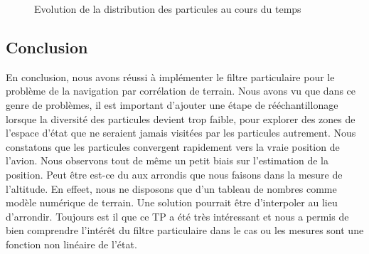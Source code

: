 \documentclass{article}
\begin{document}
\begin{figure}[h!]
\caption{Evolution de la distribution des particules au cours du temps}
\label{navigation}
\end{figure} 

\subsection{Conclusion}
En conclusion, nous avons réussi à implémenter le 
filtre particulaire pour le problème de la navigation par corrélation de terrain.
Nous avons vu que dans ce genre de problèmes, il est important d'ajouter
une étape de rééchantillonage lorsque la diversité des particules devient trop faible, pour explorer
des zones de l'espace d'état que ne seraient jamais visitées par les particules autrement. Nous constatons que 
les particules convergent rapidement vers la vraie position de l'avion. Nous observons tout de même un petit biais 
sur l'estimation de la position. Peut être est-ce du aux arrondis que nous faisons dans la mesure de l'altitude. En effeet, nous ne disposons
que d'un tableau de nombres comme modèle numérique de terrain. Une solution pourrait être d'interpoler au lieu d'arrondir. Toujours est il 
que ce TP a été très intéressant et nous a permis de bien comprendre l'intérêt du filtre particulaire 
dans le cas ou les mesures sont une fonction non linéaire de l'état.
\clearpage


\end{document}
